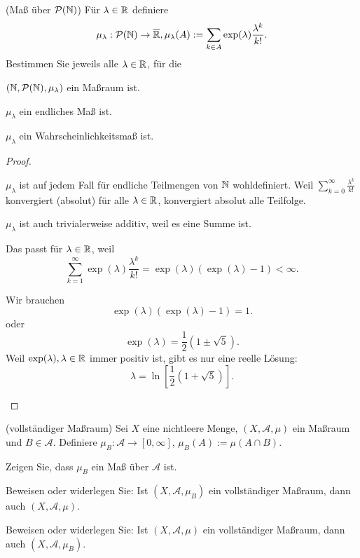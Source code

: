 \begin{Problem}
	(Maß über $\mathcal{P}(\mathbb{N})$) Für $\lambda \in \mathbb{R}$ definiere
	\[
	\mu_\lambda:\mathcal{P}(\mathbb{N})\to \overline{\mathbb{R}}, \mu_\lambda(A):=\sum_{k\in A} \exp(\lambda) \frac{\lambda^k}{k!}
	.\] 
	Bestimmen Sie jeweils alle $\lambda\in \mathbb{R}$, f\"{u}r die
	\begin{parts}
		\item $(\mathbb{N}, \mathcal{P}(\mathbb{N}), \mu_\lambda)$ ein Maßraum ist.
		\item $\mu_\lambda$ ein endliches Maß ist.
		\item $\mu_\lambda$ ein Wahrscheinlichkeitsmaß ist.
	\end{parts}
\end{Problem}
\begin{proof}
	\begin{parts}
	\item $\mu_\lambda$ ist auf jedem Fall f\"{u}r endliche Teilmengen von $\mathbb{N}$ wohldefiniert. Weil $\sum_{k=0}^\infty \frac{\lambda^k}{k!}$ konvergiert (absolut) f\"{u}r alle $\lambda\in\mathbb{R}$, konvergiert absolut alle Teilfolge. 

		$\mu_\lambda$ ist auch trivialerweise additiv, weil es eine Summe ist.
	\item Das passt f\"{u}r $\lambda \in \mathbb{R}$, weil 
		\[
		\sum_{k=1}^{\infty} \exp(\lambda) \frac{\lambda^k}{k!}=\exp(\lambda)(\exp(\lambda)-1)<\infty
		.\] 
	\item Wir brauchen
		\[
		\exp(\lambda)\left( \exp(\lambda)-1 \right) =1
		.\] 
		oder 
		\[
		\exp(\lambda)=\frac{1}{2}(1\pm \sqrt{5} )
		.\]
		Weil $\exp(\lambda), \lambda \in \mathbb{R}$ immer positiv ist, gibt es nur eine reelle Lösung:
		\[
		\lambda=\ln\left[ \frac{1}{2}\left( 1+\sqrt{5}  \right)  \right] 
		.\] 
	\end{parts}
\end{proof}
\begin{Problem}
	(vollständiger Maßraum) Sei $X$ eine nichtleere Menge, $(X, \mathcal{A}, \mu)$ ein Maßraum und $B \in \mathcal{A}$. Definiere $\mu_B : \mathcal{A} \to [0, \infty]$, $\mu_B (A) := \mu(A \cap B)$.
	\begin{parts}
	\item Zeigen Sie, dass $\mu_B$ ein Maß über $\mathcal{A}$ ist.
	\item  Beweisen oder widerlegen Sie: Ist $(X, \mathcal{A}, \mu_B)$ ein vollständiger Maßraum, dann auch $(X, \mathcal{A}, \mu)$.
	\item  Beweisen oder widerlegen Sie: Ist $(X, \mathcal{A}, \mu)$ ein vollständiger Maßraum, dann auch $(X, \mathcal{A}, \mu_B)$.
	\end{parts}
\end{Problem}
